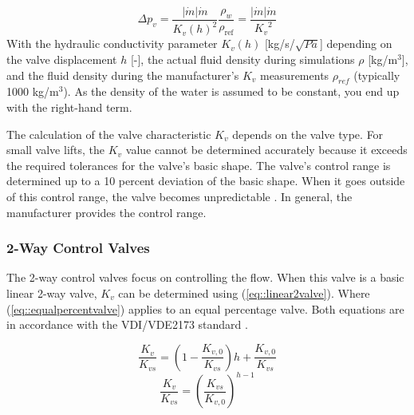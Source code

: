 \begin{equation}\label{eq::valvedp}
    \Delta p_{v} = \frac{|\dot{m}|\dot{m}}{{K_v(h)}^2} \frac{\rho_w}{\rho_{\text{ref}}}   =  \frac{|\dot{m}|\dot{m}}{{K_v}^2}
\end{equation}
With the hydraulic conductivity parameter $K_v(h)$  [kg/s/$\sqrt{Pa}$] depending on the valve displacement $h$ [-], the actual fluid density during simulations $\rho$ [kg/m$^3$], and the fluid density during the manufacturer's $K_v$ measurements $\rho_{ref}$ (typically 1000 kg/m$^3$). As the density of the water is assumed to be constant, you end up with the right-hand term. 

The calculation of the valve characteristic $K_v$ depends on the valve type. For small valve lifts, the $K_v$ value cannot be determined accurately because it exceeds the required tolerances for the valve's basic shape. The valve's control range is determined up to a 10 percent deviation of the basic shape. When it goes outside of this control range, the valve becomes unpredictable \cite{echtephdthesis}. In general, the manufacturer provides the control range. 

\subsubsection{2-Way Control Valves}
The 2-way control valves focus on controlling the flow. When this valve is a basic linear 2-way valve, $K_v$ can be determined using (\ref{eq::linear2valve}). Where (\ref{eq::equalpercentvalve}) applies to an equal percentage valve. Both equations are in accordance with the VDI/VDE2173 standard \cite{VDI/VDE2713}. 

\begin{equation}\label{eq::linear2valve}
    \frac{K_v}{K_{vs}} = \left( 1 -\frac{K_{v,0}}{K_{vs}} \right) h + \frac{K_{v,0}}{K_{vs}}
\end{equation}
\begin{equation}\label{eq::equalpercentvalve}
    \frac{K_v}{K_{vs}} = {\left(\frac{K_{vs}}{K_{v,0}} \right)}^{h - 1}
\end{equation}

